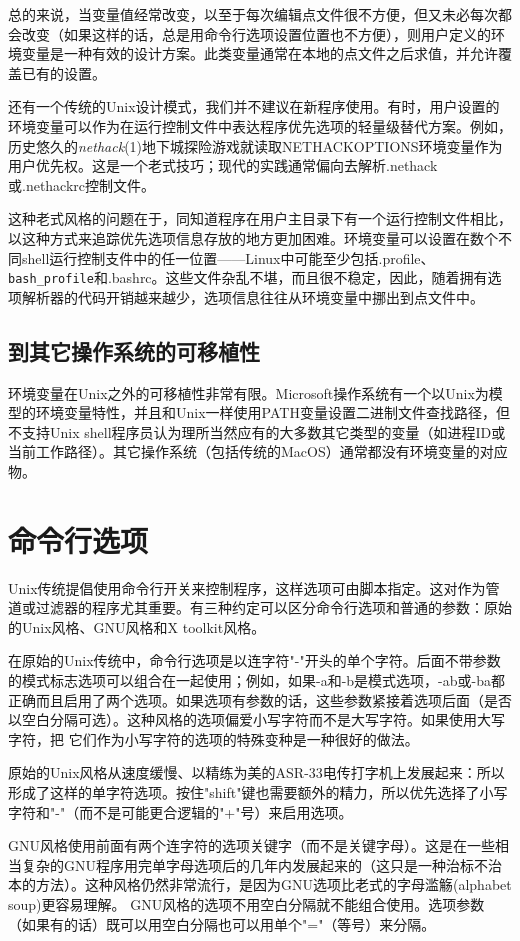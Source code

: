 \documentclass[12pt,oneside]{book}
\begin{document}
\begin{common-format}
总的来说，当变量值经常改变，以至于每次编辑点文件很不方便，但又未必每次都会改变（如果这样的话，总是用命令行选项设置位置也不方便），则用户定义的环境变量是一种有效的设计方案。此类变量通常在本地的点文件之后求值，并允许覆盖已有的设置。

还有一个传统的Unix设计模式，我们并不建议在新程序使用。有时，用户设置的环境变量可以作为在运行控制文件中表达程序优先选项的轻量级替代方案。例如，历史悠久的\textit{nethack}(1)地下城探险游戏就读取NETHACKOPTIONS环境变量作为用户优先权。这是一个老式技巧；现代的实践通常偏向去解析.nethack或.nethackrc控制文件。

这种老式风格的问题在于，同知道程序在用户主目录下有一个运行控制文件相比，以这种方式来追踪优先选项信息存放的地方更加困难。环境变量可以设置在数个不同shell运行控制支件中的任一位置——Linux中可能至少包括.profile、\verb+bash_profile+和.bashrc。这些文件杂乱不堪，而且很不稳定，因此，随着拥有选项解析器的代码开销越来越少，选项信息往往从环境变量中挪出到点文件中。

\subsection{到其它操作系统的可移植性}
环境变量在Unix之外的可移植性非常有限。Microsoft操作系统有一个以Unix为模型的环境变量特性，并且和Unix一样使用PATH变量设置二进制文件查找路径，但不支持Unix shell程序员认为理所当然应有的大多数其它类型的变量（如进程ID或当前工作路径）。其它操作系统（包括传统的MacOS）通常都没有环境变量的对应物。

\section{命令行选项}
Unix传统提倡使用命令行开关来控制程序，这样选项可由脚本指定。这对作为管道或过滤器的程序尤其重要。有三种约定可以区分命令行选项和普通的参数：原始的Unix风格、GNU风格和X toolkit风格。

在原始的Unix传统中，命令行选项是以连字符"-"开头的单个字符。后面不带参数的模式标志选项可以组合在一起使用；例如，如果-a和-b是模式选项，-ab或-ba都正确而且启用了两个选项。如果选项有参数的话，这些参数紧接着选项后面（是否以空白分隔可选）。这种风格的选项偏爱小写字符而不是大写字符。如果使用大写字符，把
它们作为小写字符的选项的特殊变种是一种很好的做法。

原始的Unix风格从速度缓慢、以精练为美的ASR-33电传打字机上发展起来：所以形成了这样的单字符选项。按住"shift"键也需要额外的精力，所以优先选择了小写字符和"-"（而不是可能更合逻辑的"+"号）来启用选项。

GNU风格使用前面有两个连字符的选项关键字（而不是关键字母）。这是在一些相当复杂的GNU程序用完单字母选项后的几年内发展起来的（这只是一种治标不治本的方法）。这种风格仍然非常流行，是因为GNU选项比老式的字母滥觞(alphabet soup)更容易理解。 GNU风格的选项不用空白分隔就不能组合使用。选项参数（如果有的话）既可以用空白分隔也可以用单个"="（等号）来分隔。


\end{common-format}
\end{document}

